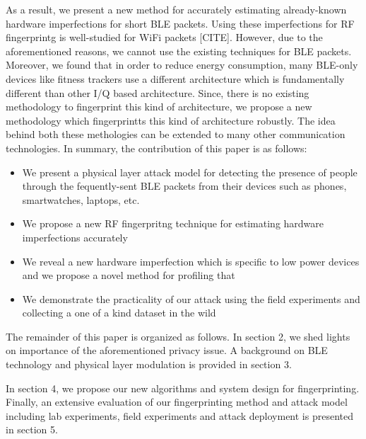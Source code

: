 As a result, we present a new method for accurately estimating already-known hardware imperfections for short BLE packets. Using these imperfections for RF fingerprintg is well-studied for WiFi packets [CITE]. However, due to the aforementioned reasons, we cannot use the existing techniques for BLE packets. Moreover, we found that in order to reduce energy consumption, many BLE-only devices like fitness trackers use a different architecture which is fundamentally different than other I/Q based architecture. Since, there is no existing methodology to fingerprint this kind of architecture, we propose a new methodology which fingerprintts this kind of architecture robustly. The idea behind both these methologies can be extended to many other communication technologies. In summary, the contribution of this paper is as follows:
\begin{itemize}
\item We present a physical layer attack model for detecting the presence of people through the fequently-sent BLE packets from their devices such as phones, smartwatches, laptops, etc.
\item We propose a new RF fingerpritng technique for estimating hardware imperfections accurately
\item We reveal a new hardware imperfection which is specific to low power devices and we propose a novel method for profiling that
\item We demonstrate the practicality of our attack using the field experiments and collecting a one of a kind dataset in the wild
\end{itemize}

The remainder of this paper is organized as follows. In section 2, we shed lights on importance of the aforementioned privacy issue. A background on BLE technology and physical layer modulation is provided in section 3.
\begin{comment}
A background on RF fingerprinting and previous techniques as well as their limitation for being applied to our problem is presented in section 3. 
\end{comment}
In section 4, we propose our new algorithms and system design for fingerprinting. Finally, an extensive evaluation of our fingerprinting method and attack model including lab experiments, field experiments and attack deployment is presented in section 5.
